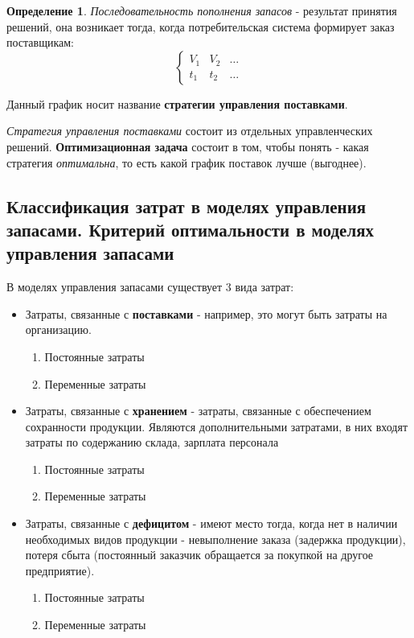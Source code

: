 \documentclass[aps,%
12pt,%
final,%
oneside,
onecolumn,%
musixtex, %
superscriptaddress,%
centertags]{article} %
\theoremstyle{plain}
\theoremstyle{definition}
\newtheorem{definition}{Определение}[subsection]
\theoremstyle{remark}
\begin{document}
\begin{definition}
	\textit{Последовательность пополнения запасов} - результат принятия решений, она возникает тогда, когда потребительская система формирует заказ поставщикам:
	$$ \left\{ \begin{matrix}
		V_1 & V_2 & \ldots \\
		t_1 & t_2 & \ldots
		\end{matrix} \right.$$

	Данный график носит название \textbf{стратегии управления поставками}.
\end{definition}

\textit{Стратегия управления поставками} состоит из отдельных управленческих решений. \textbf{Оптимизационная задача} состоит в том, чтобы понять - какая стратегия \textit{оптимальна}, то есть какой график поставок лучше (выгоднее).

\newpage
\subsection{Классификация затрат в моделях управления запасами. Критерий оптимальности в моделях управления запасами}

В моделях управления запасами существует $3$ вида затрат:
\begin{itemize}
	\item Затраты, связанные с \textbf{поставками} - например, это могут быть затраты на организацию.
	\begin{enumerate}
		\item Постоянные затраты
		\item Переменные затраты
	\end{enumerate}
	\item Затраты, связанные с \textbf{хранением} - затраты, связанные с обеспечением сохранности продукции. Являются дополнительными затратами, в них входят затраты по содержанию склада, зарплата персонала
	\begin{enumerate}
		\item Постоянные затраты
		\item Переменные затраты
	\end{enumerate}
	\item Затраты, связанные с \textbf{дефицитом} -  имеют место тогда, когда нет в наличии необходимых видов продукции - невыполнение заказа (задержка продукции), потеря сбыта (постоянный заказчик обращается за покупкой на другое предприятие).
	\begin{enumerate}
		\item Постоянные затраты
		\item Переменные затраты
	\end{enumerate}
\end{itemize}
\end{document}
